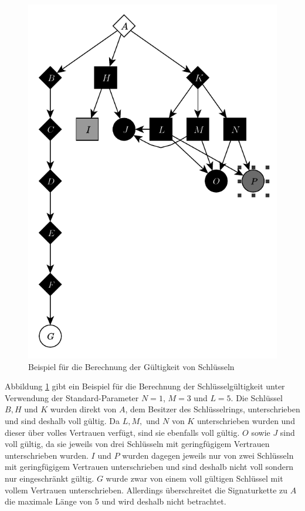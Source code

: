 \begin{figure}[t]
  \centering
  \includegraphics[scale=1.0]{images/trust-beispiel.pdf}
  \caption{Beispiel für die Berechnung der Gültigkeit von Schlüsseln}
  \label{fig:trust-beispiel}
\end{figure}

Abbildung \ref{fig:trust-beispiel} gibt ein Beispiel für die
Berechnung der Schlüsselgültigkeit unter Verwendung der
Standard-Parameter $N=1$, $M=3$ und $L=5$. Die Schlüssel $B, H$ und
$K$ wurden direkt von $A$, dem Besitzer des Schlüsselrings,
unterschrieben und sind deshalb voll gültig. Da $L, M,$ und $N$ von
$K$ unterschrieben wurden und dieser über volles Vertrauen verfügt,
sind sie ebenfalls voll gültig. $O$ sowie $J$ sind voll gültig, da sie
jeweils von drei Schlüsseln mit geringfügigem Vertrauen unterschrieben
wurden. $I$ und $P$ wurden dagegen jeweils nur von zwei Schlüsseln mit
geringfügigem Vertrauen unterschrieben und sind deshalb nicht voll
sondern nur eingeschränkt gültig. $G$ wurde zwar von einem voll
gültigen Schlüssel mit vollem Vertrauen unterschrieben. Allerdings
überschreitet die Signaturkette zu $A$ die maximale Länge von 5 und
wird deshalb nicht betrachtet.

